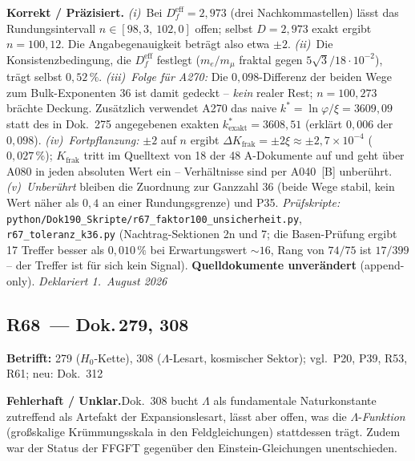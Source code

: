 \smallskip\noindent\textbf{Korrekt / Präzisiert.}\quad
\emph{(i)}~Bei $D_f^\text{eff} = 2{,}973$ (drei Nachkommastellen) lässt das
Rundungsintervall $n \in [98{,}3,\ 102{,}0]$ offen; selbst $D = 2{,}973$ exakt
ergibt $n = 100{,}12$. Die Angabegenauigkeit beträgt also etwa $\pm2$.
\emph{(ii)}~Die Konsistenzbedingung, die $D_f^\text{eff}$ festlegt
($m_e/m_\mu$ fraktal gegen $5\sqrt3/18\cdot10^{-2}$), trägt selbst
$0{,}52\,\%$. \emph{(iii)~Folge für A270:} Die $0{,}098$-Differenz der beiden
Wege zum Bulk-Exponenten $36$ ist damit gedeckt -- \emph{kein} realer Rest;
$n = 100{,}273$ brächte Deckung. Zusätzlich verwendet A270 das naive
$k^{*} = \ln\varphi/\xi = 3609{,}09$ statt des in Dok.~275 angegebenen exakten
$k^{*}_\text{exakt} = 3608{,}51$ (erklärt $0{,}006$ der $0{,}098$).
\emph{(iv)~Fortpflanzung:} $\pm2$ auf $n$ ergibt
$\Delta K_\text{frak} = \pm2\xi \approx \pm2{,}7\times10^{-4}$
($0{,}027\,\%$); $K_\text{frak}$ tritt im Quelltext von 18 der 48
A-Dokumente auf und geht über A080 in jeden absoluten Wert ein --
Verhältnisse sind per A040~[B] unberührt. \emph{(v)~Unberührt} bleiben die
Zuordnung zur Ganzzahl $36$ (beide Wege stabil, kein Wert näher als $0{,}4$ an
einer Rundungsgrenze) und P35. \emph{Prüfskripte:}
\texttt{python/Dok190\_Skripte/r67\_faktor100\_unsicherheit.py},
\texttt{r67\_toleranz\_k36.py} (Nachtrag-Sektionen 2n und 7; die
Basen-Prüfung ergibt 17 Treffer besser als $0{,}010\,\%$ bei Erwartungswert
$\sim16$, Rang von $74/75$ ist $17/399$ -- der Treffer ist für sich kein
Signal). \textbf{Quelldokumente unverändert} (append-only).
\emph{Deklariert 1.~August 2026}

\medskip

\subsection*{R68~--- Dok.\,279, 308}

\noindent\textbf{Betrifft:} 279 ($H_0$-Kette), 308 ($\Lambda$-Lesart,
kosmischer Sektor); vgl.\ P20, P39, R53, R61; neu: Dok.~312

\smallskip\noindent\textbf{Fehlerhaft / Unklar.}\quad Dok.~308 bucht
$\Lambda$ als fundamentale Naturkonstante zutreffend als Artefakt der
Expansionslesart, lässt aber offen, was die $\Lambda$-\emph{Funktion}
(großskalige Krümmungsskala in den Feldgleichungen) stattdessen trägt.
Zudem war der Status der FFGFT gegenüber den Einstein-Gleichungen
unentschieden.

